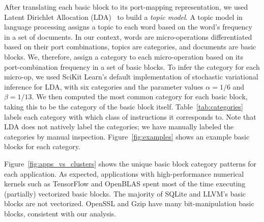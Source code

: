 After translating each basic block to its port-mapping representation, we used Latent Dirichlet Allocation (LDA)~\cite{lda} to build a \emph{topic model}. A topic model in language processing assigns a topic to each word based on the word's frequency in a set of documents. In our context, words are micro-operations differentiated based on their port combinations, topics are categories, and documents are basic blocks. We, therefore, assign a category to each micro-operation based on its port-combination frequency in a set of basic blocks.
To infer the category for each micro-op, we
used SciKit Learn's default implementation of stochastic variational inference for LDA\cite{lda},
with six categories and the parameter values $\alpha = 1/6$ and $\beta = 1/13$. 
We then computed the most common category for each basic block, taking this to be the category of the basic block itself.
Table~\ref{tab:categories} labels each category with which class of instructions it corresponds to.
Note that LDA does not natively label the categories;
we have manually labeled the categories by manual inspection.
Figure~\ref{fig:examples} shows an example basic blocks for each category.

Figure~\ref{fig:apps_vs_clusters} shows the unique basic block category patterns for each application.
As expected, applications with high-performance numerical kernels such as TensorFlow and
OpenBLAS spent most of the time executing (partially) vectorized basic blocks.
The majority of SQLite and LLVM's basic blocks are not vectorized.
OpenSSL and Gzip have many bit-manipulation basic blocks, consistent with our analysis.

